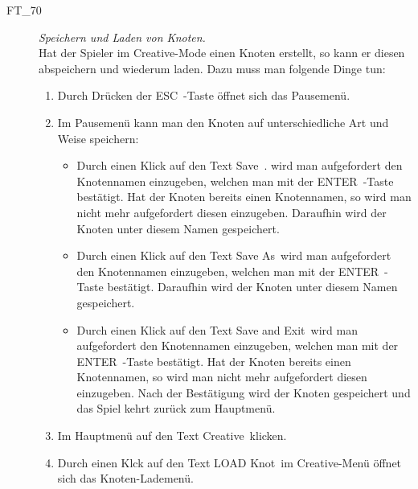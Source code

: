 \begin{description}
\begin{enumerate}
	\end{enumerate}
	
	
\clearpage



\label{FT:70}

	\item[FT\_70] \textit{Speichern und Laden von Knoten.} \hfill\\
	
	Hat der Spieler im Creative-Mode einen Knoten erstellt, so kann er diesen abspeichern und wiederum laden. Dazu muss man folgende Dinge tun:
	
		\begin{enumerate} 
	
		\item  Durch Drücken der \glqq ESC\grqq~-Taste öffnet sich das Pausemenü.
		\item Im Pausemenü kann man den Knoten auf unterschiedliche Art und Weise speichern:
		 
		\begin{itemize} 
		
        \item Durch einen Klick auf den Text \glqq Save\grqq~. wird man aufgefordert den Knotennamen einzugeben, welchen man mit der \glqq ENTER\grqq~-Taste bestätigt. Hat der Knoten bereits einen Knotennamen, so wird man nicht mehr aufgefordert diesen einzugeben. Daraufhin wird der Knoten unter diesem Namen gespeichert.
        
        \item Durch einen Klick auf den Text \glqq Save As\grqq~wird man aufgefordert den Knotennamen einzugeben, welchen man mit der \glqq ENTER\grqq~-Taste bestätigt. Daraufhin wird der Knoten unter diesem Namen gespeichert.
        
        \item Durch einen Klick auf den Text \glqq Save and Exit\grqq~wird man aufgefordert den Knotennamen einzugeben, welchen man mit der \glqq ENTER\grqq~-Taste bestätigt. Hat der Knoten bereits einen Knotennamen, so wird man nicht mehr aufgefordert diesen einzugeben. Nach der Bestätigung wird der Knoten gespeichert und das Spiel kehrt zurück zum Hauptmenü.	
		
		\end{itemize}
		
		\item Im Hauptmenü auf den Text \glqq Creative\grqq~klicken.
		
		\item Durch einen Klck auf den Text \glqq LOAD Knot\grqq~im Creative-Menü öffnet sich das Knoten-Lademenü.
		

\end{enumerate}
\end{description}
